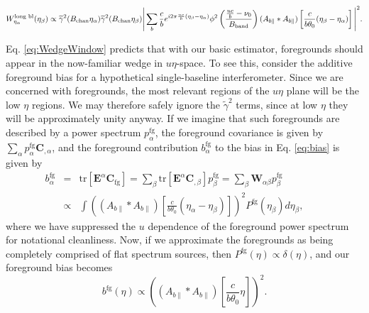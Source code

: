 \documentclass[twocolumn,aps,prd,nofootinbib,showpacs]{revtex4-1}
\begin{document}
\begin{widetext}
\begin{equation}
\label{eq:WedgeWindow}
W_{\eta_\alpha}^\textrm{long bl} (\eta_\beta) \propto \widetilde{\gamma}^2(B_\textrm{chan} \eta_\alpha)\widetilde{\gamma}^2(B_\textrm{chan} \eta_\beta) \Bigg{|} \sum_b \frac{c}{b} e^{i 2\pi \frac{uc}{b} (\eta_\beta-\eta_\alpha)} \phi^2 \left( \frac{\frac{u c}{b}-\nu_0}{B_\textrm{band}}\right) (A_{b\parallel} \ast A_{b\parallel} ) \left[ \frac{c}{b\theta_0} (\eta_\beta - \eta_\alpha) \right] \Bigg{|}^2.
\end{equation}
\end{widetext}

 Eq. \eqref{eq:WedgeWindow} predicts that with our basic estimator, foregrounds should appear in the now-familiar wedge in $u\eta$-space.  To see this, consider the additive foreground bias for a hypothetical single-baseline interferometer.  Since we are concerned with foregrounds, the most relevant regions of the $u\eta$ plane will be the low $\eta$ regions.  We may therefore safely ignore the $\widetilde{\gamma}^2$ terms, since at low $\eta$ they will be approximately unity anyway.  If we imagine that such foregrounds are described by a power spectrum $p_\alpha^\textrm{fg}$, the foreground covariance is given by $\sum_\alpha p_\alpha^\textrm{fg} \mathbf{C}_{,\alpha}$, and the foreground contribution $b_\alpha^\textrm{fg}$ to the bias in  Eq. \eqref{eq:bias} is given by
\begin{subequations}
\begin{eqnarray}
\label{eq:WindToBias}
b_\alpha^\textrm{fg} &=& \textrm{tr}  [\mathbf{E}^\alpha\mathbf{C}_\textrm{fg}] = \sum_\beta  \textrm{tr} [ \mathbf{E}^\alpha \mathbf{C}_{,\beta} ]  p_\beta^\textrm{fg} = \sum_\beta \mathbf{W}_{\alpha \beta} p_\beta^\textrm{fg} \\
& \propto &\!\! \int \! \! \left( ( A_{b\parallel} \ast A_{b\parallel}) \left[ \frac{c}{b \theta_0} (\eta_\alpha - \eta_\beta) \right]\right)^2 \!\!\! P^{\textrm{fg}} (\eta_\beta)  d\eta_\beta, \qquad
\end{eqnarray}
\end{subequations}
where we have suppressed the $u$ dependence of the foreground power spectrum for notational cleanliness.  Now, if we approximate the foregrounds as being completely comprised of flat spectrum sources, then $P^\textrm{fg} (\eta) \propto \delta(\eta)$, and our foreground bias becomes
\begin{equation}
\label{eq:anotherWedge}
b^\textrm{fg} (\eta) \propto \left( ( A_{b\parallel} \ast A_{b\parallel}) \left[ \frac{c}{b \theta_0} \eta  \right]\right)^2.
\end{equation}
\end{document}
